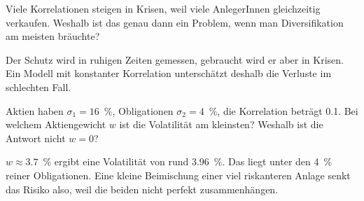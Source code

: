 \begin{myexercise}[Diskussion]
	Viele Korrelationen steigen in Krisen, weil viele AnlegerInnen gleichzeitig verkaufen. Weshalb ist das genau dann ein Problem, wenn man Diversifikation am meisten bräuchte?
	\begin{myanswer}
		Der Schutz wird in ruhigen Zeiten gemessen, gebraucht wird er aber in Krisen. Ein Modell mit konstanter Korrelation unterschätzt deshalb die Verluste im schlechten Fall.
	\end{myanswer}
\end{myexercise}

\begin{mychallenge}
	Aktien haben $\sigma_1 = 16$~\%, Obligationen $\sigma_2 = 4$~\%, die Korrelation beträgt 0.1. Bei welchem Aktiengewicht $w$ ist die Volatilität am kleinsten? Weshalb ist die Antwort nicht $w = 0$?
	\begin{myanswer}
		$w \approx 3.7$~\% ergibt eine Volatilität von rund 3.96~\%. Das liegt unter den 4~\% reiner Obligationen. Eine kleine Beimischung einer viel riskanteren Anlage senkt das Risiko also, weil die beiden nicht perfekt zusammenhängen.
	\end{myanswer}
\end{mychallenge}

